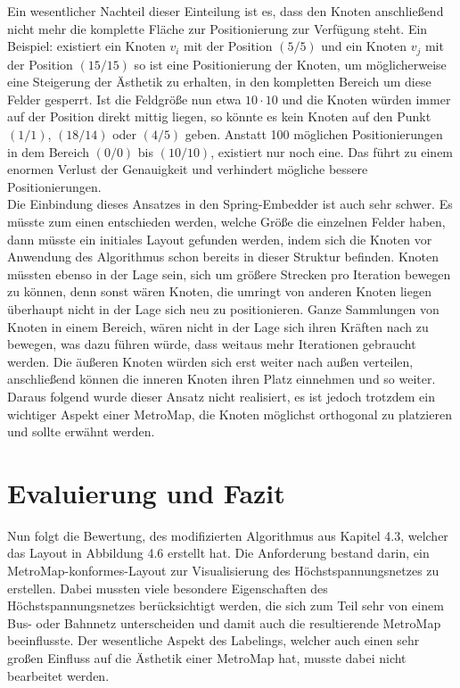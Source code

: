 Ein wesentlicher Nachteil dieser Einteilung ist es, dass den Knoten anschließend nicht mehr die komplette Fläche zur Positionierung zur Verfügung steht. Ein Beispiel: existiert ein Knoten $v_{i}$ mit der Position $(5/5)$ und ein Knoten $v_{j}$ mit der Position $(15/15)$ so ist eine Positionierung der Knoten, um möglicherweise eine Steigerung der Ästhetik zu erhalten, in den kompletten Bereich um diese Felder gesperrt. Ist die Feldgröße nun etwa $10\cdot10$ und die Knoten würden immer auf der Position direkt mittig liegen, so könnte es kein Knoten auf den Punkt $(1/1)$, $(18/14)$ oder $(4/5)$ geben. Anstatt 100 möglichen Positionierungen in dem Bereich $(0/0)$ bis $(10/10)$, existiert nur noch eine. Das führt zu einem enormen Verlust der Genauigkeit und verhindert mögliche bessere Positionierungen. \\

Die Einbindung dieses Ansatzes in den Spring-Embedder ist auch sehr schwer. Es müsste zum einen entschieden werden, welche Größe die einzelnen Felder haben, dann müsste ein initiales Layout gefunden werden, indem sich die Knoten vor Anwendung des Algorithmus schon bereits in dieser Struktur befinden. Knoten müssten ebenso in der Lage sein, sich um größere Strecken pro Iteration bewegen zu können, denn sonst wären Knoten, die umringt von anderen Knoten liegen überhaupt nicht in der Lage sich neu zu positionieren. Ganze Sammlungen von Knoten in einem Bereich, wären nicht in der Lage sich ihren Kräften nach zu bewegen, was dazu führen würde, dass weitaus mehr Iterationen gebraucht werden. Die äußeren Knoten würden sich erst weiter nach außen verteilen, anschließend können die inneren Knoten ihren Platz einnehmen und so weiter. Daraus folgend wurde dieser Ansatz nicht realisiert, es ist jedoch trotzdem ein wichtiger Aspekt einer MetroMap, die Knoten möglichst orthogonal zu platzieren und sollte erwähnt werden.



\section{Evaluierung und Fazit}
\label{Kapitel_4_-_Unterkapitel_4}

Nun folgt die Bewertung, des modifizierten Algorithmus aus Kapitel 4.3, welcher das Layout in Abbildung 4.6 erstellt hat. Die Anforderung bestand darin, ein MetroMap-konformes-Layout zur Visualisierung des Höchstspannungsnetzes zu erstellen. Dabei mussten viele besondere Eigenschaften des Höchstspannungsnetzes berücksichtigt werden, die sich zum Teil sehr von einem Bus- oder Bahnnetz unterscheiden und damit auch die resultierende MetroMap beeinflusste. Der wesentliche Aspekt des Labelings, welcher auch einen sehr großen Einfluss auf die Ästhetik einer MetroMap hat, musste dabei nicht bearbeitet werden.\\

